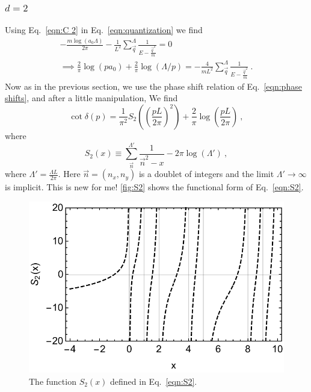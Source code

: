 \documentclass[11pt]{article}
\begin{document}
\subsubsection{$d=2$}
Using Eq.~\eqref{eqn:C 2} in Eq.~\eqref{eqn:quantization} we find
\begin{multline}
-\frac{m \log (a_0\Lambda)}{2 \pi }-\frac{1}{L^2}\sum_{\vec{q}}^\Lambda \frac { 1 } { E - \frac{\vec{q}^2}{m} }=0\\
\implies
\frac{2}{\pi}\log (pa_0)+\frac{2}{\pi}\log(\Lambda/p)=-\frac{4}{mL^2}\sum_{\vec{q}}^\Lambda \frac { 1 } { E - \frac{\vec{q}^2}{m} }\ .
\end{multline}
Now as in the previous section, we use the phase shift relation of Eq.~\eqref{eqn:phase shifts}, and after a little manipulation, We find
\begin{equation}
\cot \delta(p)=\frac{1}{\pi^2}S_2\left(\left(\frac{pL}{2\pi}\right)^2\right)+\frac{2}{\pi}\log\left(\frac{pL}{2\pi}\right)\ ,
\end{equation}
where
\begin{equation}\label{eqn:S2}
S_2(x)\equiv\sum_{\vec{n}}^{\Lambda'} \frac { 1 } { \vec{n}^2 -x}-2\pi\log\left(\Lambda'\right)\ ,
\end{equation}
where $\Lambda'=\frac{\Lambda L}{2\pi}$.
Here $\vec{n}=(n_x,n_y)$ is a doublet of integers and the limit $\Lambda'\to\infty$ is implicit.  This is new for me!  \autoref{fig:S2} shows the functional form of Eq.~\eqref{eqn:S2}.
\begin{figure}
\center
\includegraphics[width=.8\columnwidth]{figure/S2.pdf}
\caption{The function $S_2(x)$ defined in Eq.~\eqref{eqn:S2}.\label{fig:S2}}
\end{figure}
\end{document}
